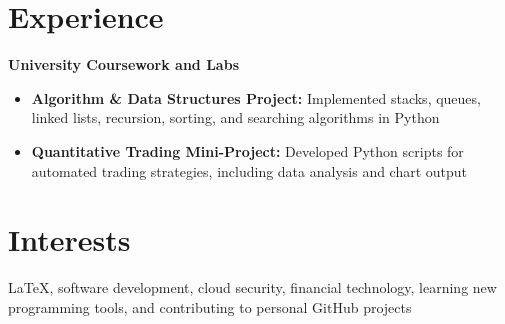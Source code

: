 \documentclass[9.5pt,a4paper]{article}
\begin{document}
\section*{Experience}
\textbf{University Coursework and Labs}
\begin{itemize}
    \item \textbf{Algorithm \& Data Structures Project:} Implemented stacks, queues, linked lists, recursion, sorting, and searching algorithms in Python
    \item \textbf{Quantitative Trading Mini-Project:} Developed Python scripts for automated trading strategies, including data analysis and chart output
\end{itemize}



\section*{Interests}
LaTeX, software development, cloud security, financial technology, learning new programming tools, and contributing to personal GitHub projects


\vspace*{6pt}
\end{document}

